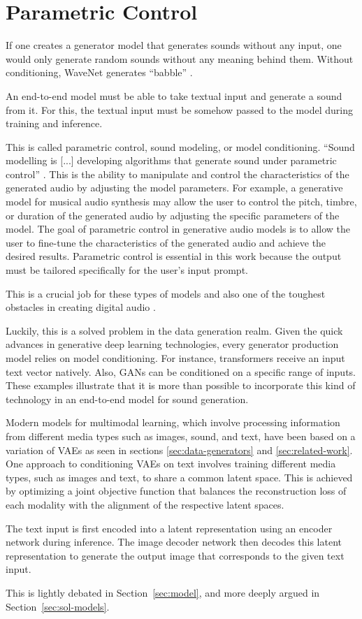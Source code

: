 \section{Parametric Control} \label{sec:parametric-control}

If one creates a generator model that generates sounds without any input, one would only generate random sounds without any meaning behind them. Without conditioning, WaveNet generates ``babble'' \cite{huzaifah_deep_2021}.

An end-to-end model must be able to take textual input and generate a sound from it. For this, the textual input must be somehow passed to the model during training and inference.

This is called parametric control, sound modeling, or model conditioning. ``Sound modelling is [...] developing algorithms that generate sound under parametric control'' \cite{huzaifah_deep_2021}. This is the ability to manipulate and control the characteristics of the generated audio by adjusting the model parameters. For example, a generative model for musical audio synthesis may allow the user to control the pitch, timbre, or duration of the generated audio by adjusting the specific parameters of the model. The goal of parametric control in generative audio models is to allow the user to fine-tune the characteristics of the generated audio and achieve the desired results. Parametric control is essential in this work because the output must be tailored specifically for the user's input prompt.

This is a crucial job for these types of models and also one of the toughest obstacles in creating digital audio \cite{huzaifah_deep_2021}.

Luckily, this is a solved problem in the data generation realm. Given the quick advances in generative deep learning technologies, every generator production model relies on model conditioning. For instance, transformers receive an input text vector natively. Also, \acp{GAN} can be conditioned on a specific range of inputs. These examples illustrate that it is more than possible to incorporate this kind of technology in an end-to-end model for sound generation.

Modern models for multimodal learning, which involve processing information from different media types such as images, sound, and text, have been based on a variation of \acp{VAE} as seen in sections \ref{sec:data-generators} and \ref{sec:related-work}. One approach to conditioning \acp{VAE} on text involves training different media types, such as images and text, to share a common latent space. This is achieved by optimizing a joint objective function that balances the reconstruction loss of each modality with the alignment of the respective latent spaces.

The text input is first encoded into a latent representation using an encoder network during inference. The image decoder network then decodes this latent representation to generate the output image that corresponds to the given text input.

This is lightly debated in Section~\ref{sec:model}, and more deeply argued in Section~\ref{sec:sol-models}.